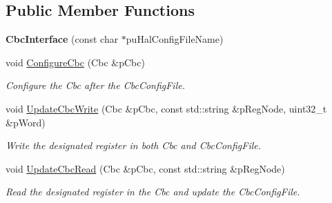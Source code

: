\subsection*{Public Member Functions}
\begin{DoxyCompactItemize}
\item 
\hypertarget{class_ph2___hw_interface_1_1_cbc_interface_a3ddefe5549da06a7d26fee1502a792b4}{{\bfseries Cbc\-Interface} (const char $\ast$pu\-Hal\-Config\-File\-Name)}\label{class_ph2___hw_interface_1_1_cbc_interface_a3ddefe5549da06a7d26fee1502a792b4}

\item 
\hypertarget{class_ph2___hw_interface_1_1_cbc_interface_af5cf4eb5b7134835f00349cb19f35c56}{void \hyperlink{class_ph2___hw_interface_1_1_cbc_interface_af5cf4eb5b7134835f00349cb19f35c56}{Configure\-Cbc} (Cbc \&p\-Cbc)}\label{class_ph2___hw_interface_1_1_cbc_interface_af5cf4eb5b7134835f00349cb19f35c56}

\begin{DoxyCompactList}\small\item\em Configure the Cbc after the Cbc\-Config\-File. \end{DoxyCompactList}\item 
\hypertarget{class_ph2___hw_interface_1_1_cbc_interface_a498d71b5709e0524b8e9dc50b92d1424}{void \hyperlink{class_ph2___hw_interface_1_1_cbc_interface_a498d71b5709e0524b8e9dc50b92d1424}{Update\-Cbc\-Write} (Cbc \&p\-Cbc, const std\-::string \&p\-Reg\-Node, uint32\-\_\-t \&p\-Word)}\label{class_ph2___hw_interface_1_1_cbc_interface_a498d71b5709e0524b8e9dc50b92d1424}

\begin{DoxyCompactList}\small\item\em Write the designated register in both Cbc and Cbc\-Config\-File. \end{DoxyCompactList}\item 
\hypertarget{class_ph2___hw_interface_1_1_cbc_interface_ab08ea1de98fe120098a4f5c52e017393}{void \hyperlink{class_ph2___hw_interface_1_1_cbc_interface_ab08ea1de98fe120098a4f5c52e017393}{Update\-Cbc\-Read} (Cbc \&p\-Cbc, const std\-::string \&p\-Reg\-Node)}\label{class_ph2___hw_interface_1_1_cbc_interface_ab08ea1de98fe120098a4f5c52e017393}

\begin{DoxyCompactList}\small\item\em Read the designated register in the Cbc and update the Cbc\-Config\-File. \end{DoxyCompactList}\end{DoxyCompactItemize}
